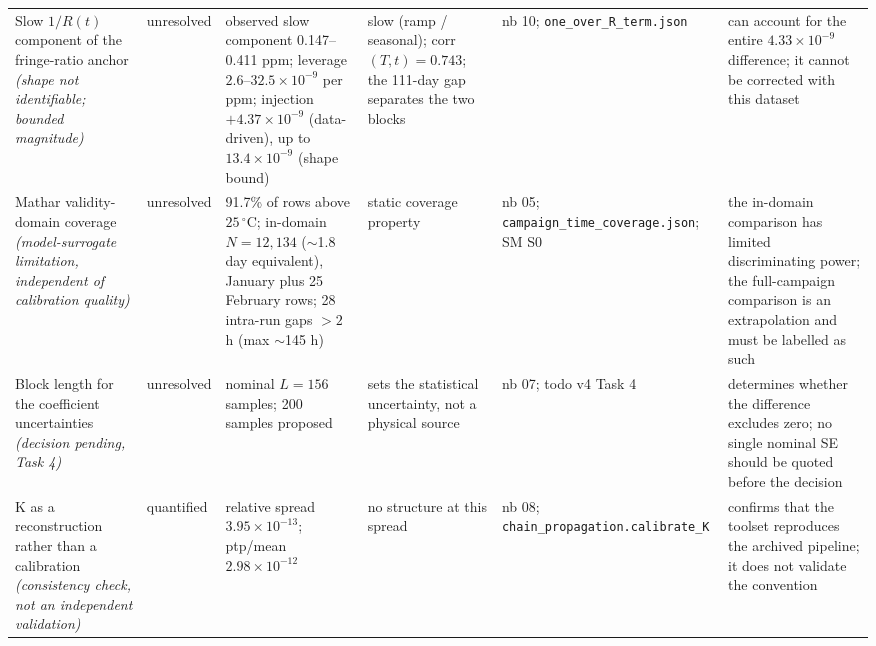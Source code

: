 \begin{table}[htbp]
\begin{tabular}{@{}p{}p{}p{}p{}p{}p{}@{}}
Slow $1/R(t)$ component of the fringe-ratio anchor \emph{(shape not identifiable; bounded magnitude)} & unresolved & observed slow component 0.147--0.411 ppm; leverage $2.6$--$32.5\times10^{-9}$ per ppm; injection $+4.37\times10^{-9}$ (data-driven), up to $13.4\times10^{-9}$ (shape bound) & slow (ramp / seasonal); corr$(T,t) = 0.743$; the 111-day gap separates the two blocks & nb 10; \texttt{one\_over\_R\_term.json} & can account for the entire $4.33\times10^{-9}$ difference; it cannot be corrected with this dataset \\
Mathar validity-domain coverage \emph{(model-surrogate limitation, independent of calibration quality)} & unresolved & 91.7\% of rows above $25\,^\circ$C; in-domain $N = 12{,}134$ ($\sim$1.8 day equivalent), January plus 25 February rows; 28 intra-run gaps $> 2$ h (max $\sim$145 h) & static coverage property & nb 05; \texttt{campaign\_time\_coverage.json}; SM S0 & the in-domain comparison has limited discriminating power; the full-campaign comparison is an extrapolation and must be labelled as such \\
Block length for the coefficient uncertainties \emph{(decision pending, Task 4)} & unresolved & nominal $L = 156$ samples; 200 samples proposed & sets the statistical uncertainty, not a physical source & nb 07; todo v4 Task 4 & determines whether the difference excludes zero; no single nominal SE should be quoted before the decision \\
K as a reconstruction rather than a calibration \emph{(consistency check, not an independent validation)} & quantified & relative spread $3.95\times10^{-13}$; ptp/mean $2.98\times10^{-12}$ & no structure at this spread & nb 08; \texttt{chain\_propagation.calibrate\_K} & confirms that the toolset reproduces the archived pipeline; it does not validate the convention \\
\hline
\end{tabular}
\end{table}

